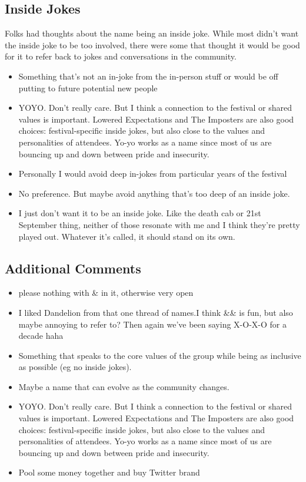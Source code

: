 \documentclass[
]{book}
\providecommand{\tightlist}{%
  \setlength{\itemsep}{0pt}\setlength{\parskip}{0pt}}
\begin{document}
\subsection{Inside Jokes}\label{inside-jokes}

Folks had thoughts about the name being an inside joke. While most didn't want the inside joke to be too involved, there were some that thought it would be good for it to refer back to jokes and conversations in the community.

\begin{itemize}
\tightlist
\item
  Something that's not an in-joke from the in-person stuff or would be off putting to future potential new people
\item
  YOYO. Don't really care. But I think a connection to the festival or shared values is important. Lowered Expectations and The Imposters are also good choices: festival-specific inside jokes, but also close to the values and personalities of attendees. Yo-yo works as a name since most of us are bouncing up and down between pride and insecurity.
\item
  Personally I would avoid deep in-jokes from particular years of the festival
\item
  No preference. But maybe avoid anything that's too deep of an inside joke.
\item
  I just don't want it to be an inside joke. Like the death cab or 21st September thing, neither of those resonate with me and I think they're pretty played out. Whatever it's called, it should stand on its own.
\end{itemize}

\subsection{Additional Comments}\label{additional-comments-1}

\begin{itemize}
\tightlist
\item
  please nothing with \& in it, otherwise very open
\item
  I liked Dandelion from that one thread of names.I think \&\& is fun, but also maybe annoying to refer to? Then again we've been saying X-O-X-O for a decade haha
\item
  Something that speaks to the core values of the group while being as inclusive as possible (eg no inside jokes).
\item
  Maybe a name that can evolve as the community changes.
\item
  YOYO. Don't really care. But I think a connection to the festival or shared values is important. Lowered Expectations and The Imposters are also good choices: festival-specific inside jokes, but also close to the values and personalities of attendees. Yo-yo works as a name since most of us are bouncing up and down between pride and insecurity.
\item
  Pool some money together and buy Twitter brand
\end{itemize}
\end{document}
